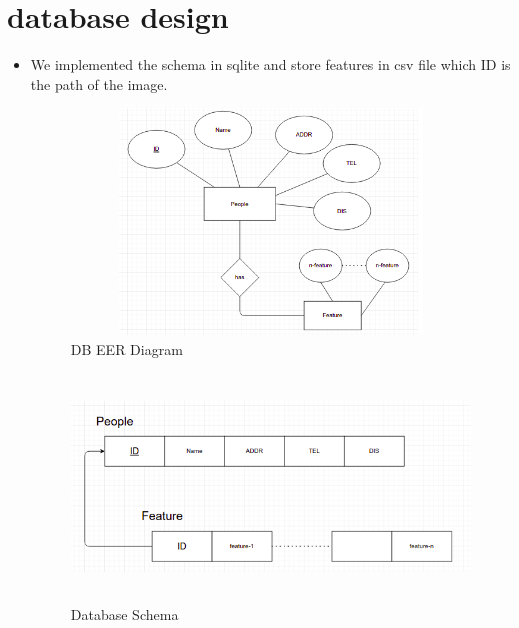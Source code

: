 \documentclass[pdftex,10pt,a4paper,oneside]{article}
\begin{document}
\pagebreak
	\section{database design}
	\begin{itemize}
		\item We implemented the schema in sqlite and store features in csv file which ID is the path of the image.
			\begin{figure}[H]
			\centering
			\includegraphics[width=120mm,height=60mm]{fig/25.png}
			\caption{DB EER Diagram }
			\label{DB EER Diagram }
		\end{figure}
	\begin{figure}[H]
		\centering
		\includegraphics[width=120mm,height=60mm]{fig/24.png}
		\caption{Database Schema   }
		\label{Database Schema }
	\end{figure}
	\end{itemize}
\end{document}
